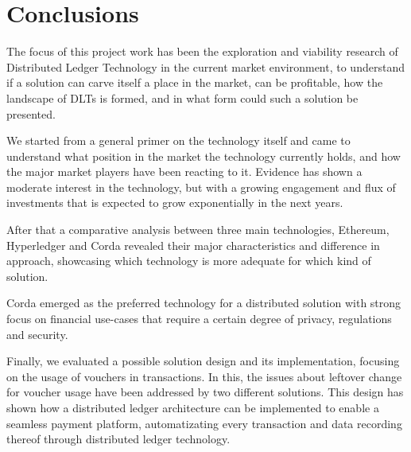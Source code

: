 \chapter{Conclusions}
\label{chap:conclusions}

The focus of this project work has been the exploration and viability research of Distributed Ledger Technology in the current market environment, to understand if a solution can carve itself a place in the market, can be profitable, how the landscape of DLTs is formed, and in what form could such a solution be presented. 

We started from a general primer on the technology itself and came to understand what position in the market the technology currently holds, and how the major market players have been reacting to it. 
Evidence has shown a moderate interest in the technology, but with a growing engagement and flux of investments that is expected to grow exponentially in the next years.

After that a comparative analysis between three main technologies, Ethereum, Hyperledger and Corda revealed their major characteristics and difference in approach, showcasing which technology is more adequate for which kind of solution. 

Corda emerged as the preferred technology for a distributed solution with strong focus on financial use-cases that require a certain degree of privacy, regulations and security.

Finally, we evaluated a possible solution design and its implementation, focusing on the usage of vouchers in transactions. 
In this, the issues about leftover change for voucher usage have been addressed by two different solutions. 
This design has shown how a distributed ledger architecture can be implemented to enable a seamless payment platform, automatizating every transaction and data recording thereof through distributed ledger technology.